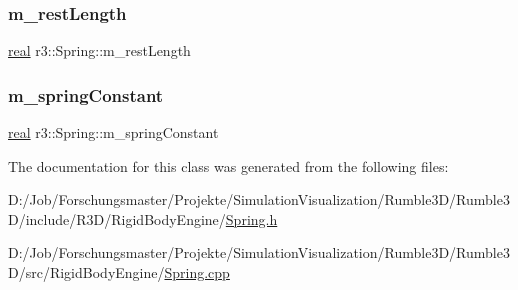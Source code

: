 \mbox{\label{classr3_1_1_spring_ad1c8ba98c782bee7f9896d0c868b9ee7}} 
\subsubsection{\texorpdfstring{m\+\_\+rest\+Length}{m\_restLength}}
{\footnotesize\ttfamily \mbox{\hyperlink{namespacer3_ab2016b3e3f743fb735afce242f0dc1eb}{real}} r3\+::\+Spring\+::m\+\_\+rest\+Length\hspace{0.3cm}{\ttfamily [protected]}}

\mbox{\label{classr3_1_1_spring_a06963e33fd2c3f8e25ddd345324b292b}} 
\subsubsection{\texorpdfstring{m\+\_\+spring\+Constant}{m\_springConstant}}
{\footnotesize\ttfamily \mbox{\hyperlink{namespacer3_ab2016b3e3f743fb735afce242f0dc1eb}{real}} r3\+::\+Spring\+::m\+\_\+spring\+Constant\hspace{0.3cm}{\ttfamily [protected]}}



The documentation for this class was generated from the following files\+:\begin{DoxyCompactItemize}
\item 
D\+:/\+Job/\+Forschungsmaster/\+Projekte/\+Simulation\+Visualization/\+Rumble3\+D/\+Rumble3\+D/include/\+R3\+D/\+Rigid\+Body\+Engine/\mbox{\hyperlink{_spring_8h}{Spring.\+h}}\item 
D\+:/\+Job/\+Forschungsmaster/\+Projekte/\+Simulation\+Visualization/\+Rumble3\+D/\+Rumble3\+D/src/\+Rigid\+Body\+Engine/\mbox{\hyperlink{_spring_8cpp}{Spring.\+cpp}}\end{DoxyCompactItemize}
